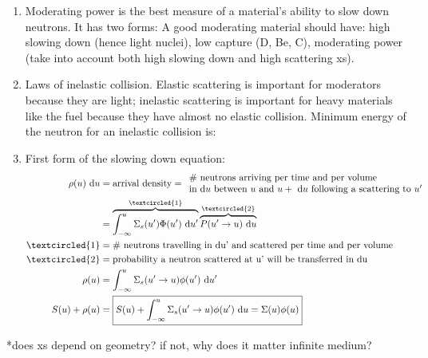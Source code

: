 \documentclass{school-22.211-notes}
\begin{document}
\begin{enumerate}
\item Moderating power is the best measure of a material's ability to slow down neutrons. It has two forms:
A good moderating material should have: high slowing down (hence light nuclei), low capture (D, Be, C), moderating power (take into account both high slowing down and high scattering xs). 

\item Laws of inelastic collision. Elastic scattering is important for moderators because they are light; inelastic scattering is important for heavy materials like the fuel because they have almost no elastic collision. Minimum energy of the neutron for an inelastic collision is:

\item First form of the slowing down equation:
  \begin{align}
    \rho(u) \du 
    &= \mbox{arrival density} = \begin{array}{l}
      \mbox{\# neutrons arriving per time and per volume} \\
      \mbox{in d$u$ between $u$ and $u + \du$ following a scattering to $u'$} 
      \end{array} \\
    &= \overbrace{\int_{-\infty}^u \Sigma_s (u') \Phi(u') \du'}^{\textcircled{1}} \overbrace{ P(u'\to u) \du }^{\textcircled{2}} \\
    \textcircled{1} &= \mbox{\# neutrons travelling in du' and scattered per time and per volume} \\
    \textcircled{2} &= \mbox{probability a neutron scattered at u' will be transferred in du} \\
    \rho(u) &= \int_{-\infty}^u \Sigma_s (u'\to u) \phi(u') \du' \\
    S(u) + \rho(u) &= \boxed{S(u) + \int_{-\infty}^u \Sigma_s (u'\to u) \phi(u') \du  = \Sigma(u) \phi(u) }
  \end{align}
\end{enumerate}




*does xs depend on geometry? if not, why does it matter infinite medium? 
\end{document}
